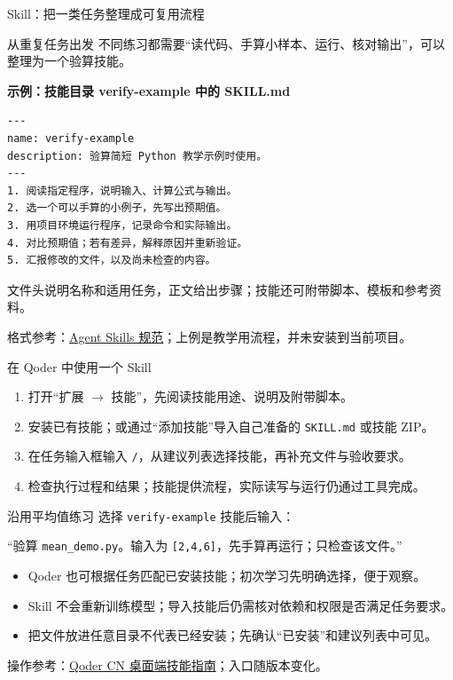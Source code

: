 \documentclass[9pt]{ctexbeamer}
\begin{document}
\begin{frame}[fragile]{Skill：把一类任务整理成可复用流程}
  \begin{block}{从重复任务出发}
    不同练习都需要“读代码、手算小样本、运行、核对输出”，可以整理为一个验算技能。
  \end{block}
  \textbf{示例：技能目录 verify-example 中的 SKILL.md}
\begin{lstlisting}[language={},numbers=none,basicstyle=\ttfamily\small]
---
name: verify-example
description: 验算简短 Python 教学示例时使用。
---
1. 阅读指定程序，说明输入、计算公式与输出。
2. 选一个可以手算的小例子，先写出预期值。
3. 用项目环境运行程序，记录命令和实际输出。
4. 对比预期值；若有差异，解释原因并重新验证。
5. 汇报修改的文件，以及尚未检查的内容。
\end{lstlisting}
  {\small 文件头说明名称和适用任务，正文给出步骤；技能还可附带脚本、模板和参考资料。}
  \par{\tiny 格式参考：\href{https://agentskills.io/specification}{Agent Skills 规范}；上例是教学用流程，并未安装到当前项目。}
\end{frame}

\begin{frame}{在 Qoder 中使用一个 Skill}
  \begin{enumerate}
    \item 打开“扩展 $\rightarrow$ 技能”，先阅读技能用途、说明及附带脚本。
    \item 安装已有技能；或通过“添加技能”导入自己准备的 \texttt{SKILL.md} 或技能 ZIP。
    \item 在任务输入框输入 \texttt{/}，从建议列表选择技能，再补充文件与验收要求。
    \item 检查执行过程和结果；技能提供流程，实际读写与运行仍通过工具完成。
  \end{enumerate}
  \begin{block}{沿用平均值练习}
    选择 \texttt{verify-example} 技能后输入：\par
    “验算 \texttt{mean\_demo.py}。输入为 \texttt{[2,4,6]}，先手算再运行；只检查该文件。”
  \end{block}
  \begin{itemize}
    \item Qoder 也可根据任务匹配已安装技能；初次学习先明确选择，便于观察。
    \item Skill 不会重新训练模型；导入技能后仍需核对依赖和权限是否满足任务要求。
    \item 把文件放进任意目录不代表已经安装；先确认“已安装”和建议列表中可见。
  \end{itemize}
  {\tiny 操作参考：\href{https://docs.qoder.cn/qoder/skills}{Qoder CN 桌面端技能指南}；入口随版本变化。}
\end{frame}
\end{document}
